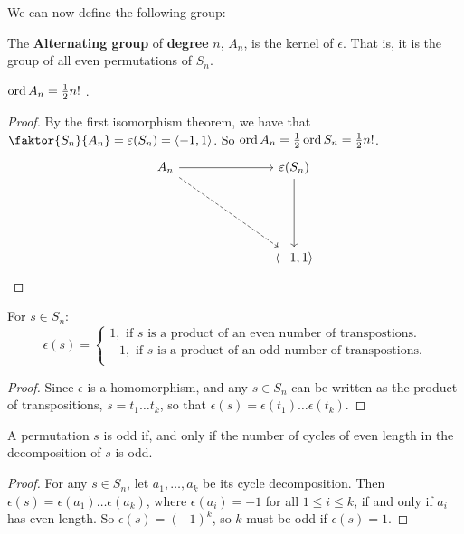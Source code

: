 We can now define the following group:

\begin{definition}
  The \textbf{Alternating group} of \textbf{degree} $n$,  $A_n$, is the kernel
  of  $\epsilon$. That is, it is the group of all even permutations of $S_n$.
\end{definition}

\begin{lemma}\label{lemma_3.6.4}
  $\operatorname{ord}{A_n}=\frac{1}{2}n!$ .
\end{lemma}
\begin{proof}
  By the first isomorphism theorem, we have that
  $\faktor{S_n}{A_n}=\epsilon(S_n)=\langle -1 ,1 \rangle$. So
  $\operatorname{ord}{A_n}=\frac{1}{2}\operatorname{ord}{S_n}=\frac{1}{2}n!$.
  \[\begin{tikzcd}
    {A_n} &&& {\epsilon(S_n)} \\
    \\
    \\
          &&& {\langle -1, 1 \rangle}
          \arrow[from=1-1, to=1-4]
          \arrow[from=1-4, to=4-4]
          \arrow[dashed, from=1-1, to=4-4]
  \end{tikzcd}\]
\end{proof}
\begin{corollary}
  For $s \in S_n$:
  \begin{equation*}
    \epsilon(s)=\begin{cases}
      1, \text{ if } s \text{ is a product of an even number of
      transpostions.} \\
      -1, \text{ if } s \text{ is a product of an odd number of
      transpostions.} \\
    \end{cases}
  \end{equation*}
\end{corollary}
\begin{proof}
  Since $\epsilon$ is a homomorphism, and any $s \in S_n$ can be written as
  the product of transpositions, $s=t_1 \dots t_k$, so that
  $\epsilon(s)=\epsilon(t_1) \dots \epsilon(t_k)$.
\end{proof}

\begin{lemma}\label{lemma_3.6.5}
  A permutation $s$ is odd if, and only if the number of cycles of even length
  in the decomposition of $s$ is odd.
\end{lemma}
\begin{proof}
  For any $s \in S_n$, let  $a_1, \dots, a_k$ be its cycle decomposition. Then
  $\epsilon(s)=\epsilon(a_1) \dots \epsilon(a_k)$, where $\epsilon(a_i)=-1$
  for all $1 \leq i \leq k$, if and only if $a_i$ has even length. So
  $\epsilon(s)=(-1)^k$, so $k$ must be odd if  $\epsilon(s)=1$.
\end{proof}

